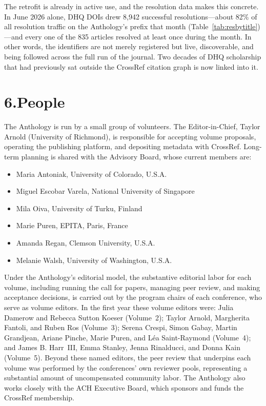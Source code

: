 \documentclass[11pt]{article}
\begin{document}
The retrofit is already in active use, and the resolution data makes this concrete. In June 2026 alone, DHQ DOIs drew 8,942 successful resolutions---about 82\% of all resolution traffic on the Anthology's prefix that month (Table~\ref{tab:resbytitle})---and every one of the 835 articles resolved at least once during the month. In other words, the identifiers are not merely registered but live, discoverable, and being followed across the full run of the journal. Two decades of DHQ scholarship that had previously sat outside the CrossRef citation graph is now linked into it.

\section*{6.\quad People}

The Anthology is run by a small group of volunteers. The Editor-in-Chief, Taylor Arnold (University of Richmond), is responsible for accepting volume proposals, operating the publishing platform, and depositing metadata with CrossRef. Long-term planning is shared with the Advisory Board, whose current members are:

\begin{itemize}[leftmargin=1.5em]
\item Maria Antoniak, University of Colorado, U.S.A.
\item Miguel Escobar Varela, National University of Singapore
\item Mila Oiva, University of Turku, Finland
\item Marie Puren, EPITA, Paris, France
\item Amanda Regan, Clemson University, U.S.A.
\item Melanie Walsh, University of Washington, U.S.A.
\end{itemize}

Under the Anthology's editorial model, the substantive editorial labor for each volume, including running the call for papers, managing peer review, and making acceptance decisions, is carried out by the program chairs of each conference, who serve as volume editors. In the first year these volume editors were: Julia Damerow and Rebecca Sutton Koeser (Volume~2); Taylor Arnold, Margherita Fantoli, and Ruben Ros (Volume~3); Serena Crespi, Simon Gabay, Martin Grandjean, Ariane Pinche, Marie Puren, and L\'ea Saint-Raymond (Volume~4); and James B. Harr~III, Emma Stanley, Jenna Rinalducci, and Donna Kain (Volume~5). Beyond these named editors, the peer review that underpins each volume was performed by the conferences' own reviewer pools, representing a substantial amount of uncompensated community labor. The Anthology also works closely with the ACH Executive Board, which sponsors and funds the CrossRef membership.
\end{document}
